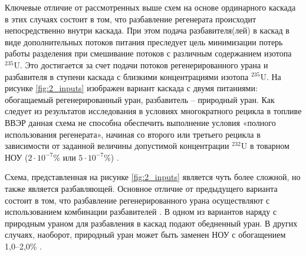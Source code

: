 Ключевые отличие от рассмотренных выше схем на основе ординарного каскада в этих случаях состоит в том, что разбавление регенерата происходит непосредственно внутри каскада. При этом подача разбавителя(лей) в каскад в виде дополнительных потоков питания преследует цель минимизации потерь работы разделения при смешивание потоков с различным содержанием изотопа $^{235}$U. Это достигается за счет подачи потоков регенерированного урана и разбавителя в ступени каскада с близкими концентрациями изотопа $^{235}$U.
На рисунке \ref{fig:2_inputs} изображен вариант каскада с двумя питаниями: обогащаемый регенерированный уран, разбавитель -- природный уран. Как следует из результатов исследования \cite{smirnovEvolutionIsotopicComposition2012} в условиях многократного рецикла в топливе ВВЭР данная схема не способна обеспечить выполнение условия «полного использования регенерата», начиная со второго или третьего рецикла в зависимости от заданной величины допустимой концентрации $^{232}$U в товарном НОУ ($2\cdot10^{-7}$\% или $5\cdot10^{-7}$\%) \cite{rodionovaAnalizTehnikoekonomicheskihHarakteristik2019,smirnovFizikotehnicheskieProblemyObogashcheniya2020}.

Схема, представленная на рисунке \ref{fig:2_inputs} является чуть более сложной, но также является разбавляющей. Основное отличие от предыдущего варианта состоит в том, что разбавление регенерированного урана осуществляют с использованием комбинации разбавителей \cite{smirnovObogashchenieRegenerirovannogoUrana2014}. В одном из вариантов наряду с природным ураном для разбавления в каскад подают обедненный уран. В других случаях, наоборот, природный уран может быть заменен НОУ с обогащением 1,0--2,0\% \cite{smirnovObogashchenieRegenerirovannogoUrana2017}.

